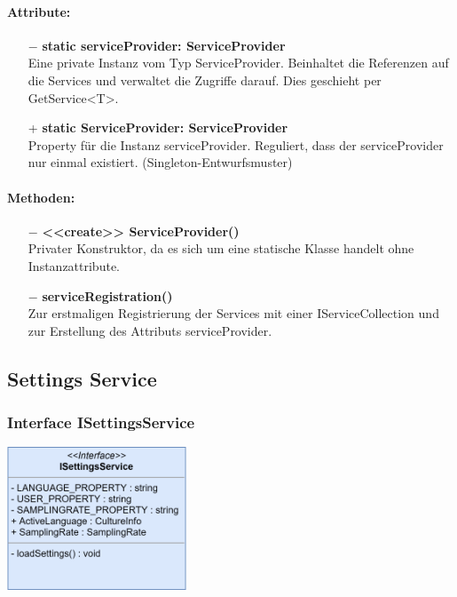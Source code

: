 \documentclass[a4paper,12pt]{article}
\begin{document}
	\paragraph{Attribute:}
	\begin{itemize}
		\item[$-$] \textbf{static serviceProvider: ServiceProvider}\\Eine private Instanz vom Typ ServiceProvider. Beinhaltet die Referenzen auf die Services und verwaltet die Zugriffe darauf. Dies geschieht per GetService<T>.
		\item[+] \textbf{static ServiceProvider: ServiceProvider}\\Property für die Instanz serviceProvider. Reguliert, dass der serviceProvider nur einmal existiert. (Singleton-Entwurfsmuster)

	\end{itemize}
	\paragraph{Methoden:}
	\begin{itemize}
		\item[$-$] \textbf{<<create>> ServiceProvider()}\\Privater Konstruktor, da es sich um eine statische Klasse handelt ohne Instanzattribute.
		\item[$-$] \textbf{serviceRegistration()}\\ Zur erstmaligen Registrierung der Services mit einer IServiceCollection und zur Erstellung des Attributs serviceProvider.\\
	\end{itemize}
		
		
\subsection{Settings Service}

\subsubsection{Interface ISettingsService}
\includegraphics[width=0.4\textwidth]{bilder/EMKlassen/ISettingsServiceInterface.png}
\end{document}
